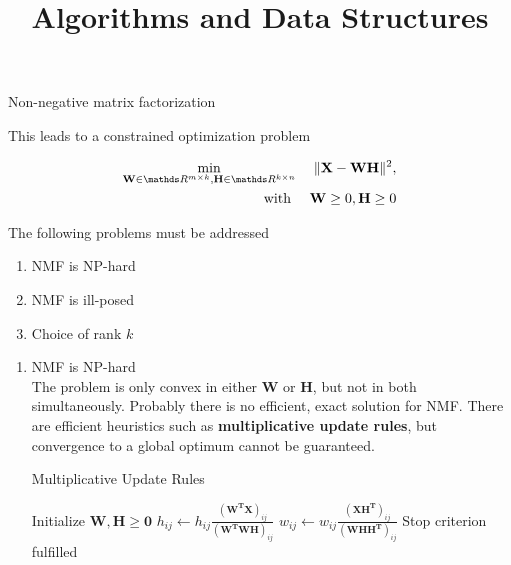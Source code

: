 \documentclass[11pt,compress,t,notes=noshow, xcolor=table]{beamer}
\title{Algorithms and Data Structures}
\begin{document}

\begin{vbframe}{Non-negative matrix factorization}

This leads to a constrained optimization problem 

\begin{eqnarray*}
 \min_{\mathbf{W}\in \R^{m \times k}, \mathbf{H}\in \R^{k \times n}} & & \|\mathbf{X} - \mathbf{WH}\|^2, \\
\text{with } & & \mathbf{W} \ge 0, \mathbf{H} \ge 0
\end{eqnarray*}

The following problems must be addressed

\begin{enumerate}
\item NMF is NP-hard
\item NMF is ill-posed
\item Choice of rank $k$
\end{enumerate}

\framebreak

\begin{enumerate}
\item NMF is NP-hard \\

The problem is only convex in either $\mathbf{W}$ or $\mathbf{H}$, but not in both simultaneously. Probably there is no efficient, exact solution for NMF. There are efficient heuristics such as \textbf{multiplicative update rules}, but convergence to a global optimum cannot be guaranteed.

\begin{algorithm}[H]
  \caption{Multiplicative Update Rules}
  \begin{algorithmic}[1]
  \State Initialize $\mathbf{W}, \mathbf{H} \ge \mathbf{0}$
  \Repeat
    \State $h_{ij} \leftarrow h_{ij} \frac{(\mathbf{W^TX})_{ij}}{(\mathbf{W^TWH})_{ij}}$
    \State $w_{ij} \leftarrow w_{ij} \frac{(\mathbf{XH^T})_{ij}}{(\mathbf{WHH^T})_{ij}}$
  \Until Stop criterion fulfilled
  \end{algorithmic}
\end{algorithm}


\end{enumerate}
\end{vbframe}
\end{document}
